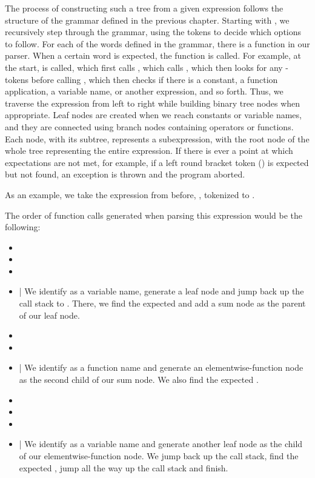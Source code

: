 \documentclass[12pt, a4paper]{report}
\begin{document}
The process  of constructing such a tree from a given expression follows the structure of the grammar defined in the previous chapter.
Starting with , we recursively step through the grammar, using the tokens to decide which options to follow.
For each of the words defined in the grammar, there is a function in our parser.
When a certain word is expected, the function is called.
For example, at the start,  is called, which first calls , which calls , which then looks for any -tokens before calling , which then checks if there is a constant, a function application, a variable name, or another expression, and so forth.
Thus, we traverse the expression from left to right while building binary tree nodes when appropriate.
Leaf nodes are created when we reach constants or variable names, and they are connected using branch nodes containing operators or functions.
Each node, with its subtree, represents a subexpression, with the root node of the whole tree representing the entire expression.
If there is ever a point at which expectations are not met, for example, if a left round bracket token () is expected but not found, an exception is thrown and the program aborted.

As an example, we take the expression from before, , tokenized to .

The order of function calls generated when parsing this expression would be the following:

\begin{itemize}
    \setlength\itemsep{0.01em}
    \item {}
    \item {}
    \item {}
    \item {} | We identify  as a variable name, generate a leaf node and jump back up the call stack to . There, we find the expected  and add a sum node as the parent of our leaf node.
    \item {}
    \item {}
    \item {} | We identify  as a function name and generate an elementwise-function node as the second child of our sum node. We also find the expected .
    \item {}
    \item {}
    \item {}
    \item {} | We identify  as a variable name and generate another leaf node as the child of our elementwise-function node. We jump back up the call stack, find the expected , jump all the way up the call stack and finish.
\end{itemize}
\end{document}
